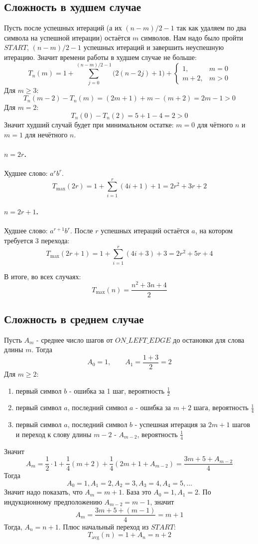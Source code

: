 \documentclass[12pt]{article}
\begin{document}
\subsection*{Сложность в худшем случае}

Пусть после успешных итераций (а их $(n-m)/2-1$ так как
удаляем по два символа на успешной итерации) 
остаётся $m$ символов.
Нам надо было пройти $START$, $(n-m)/2-1$ успешных итераций и завершить неуспешную итерацию.
Значит времени работы в худшем случае не больше:
\[
 T_n(m)=1+\sum_{j=0}^{(n-m)/2-1}\bigl(2(n-2j)+1\bigr)+\begin{cases}
 1,&m=0\\
 m+2,&m>0
 \end{cases}
\]
Для $m\geq3$:
\[
 T_n(m-2)-T_n(m)=(2m+1)+m-(m+2)=2m-1>0
\]
Для $m=2$:
\[
 T_n(0)-T_n(2)=5+1-4=2>0
\]
Значит худший случай будет при минимальном остатке:
$m=0$ для чётного $n$ и $m=1$ для нечётного $n$.

\paragraph{$n=2r$.}
Худшее слово: $a^r b^r$.
\[
 T_{\max}(2r)
 =1+\sum_{i=1}^{r}(4i+1)+1
 =2r^2+3r+2
\]

\paragraph{$n=2r+1$.}
Худшее слово: $a^{r+1}b^r$. После $r$ успешных итераций
остаётся $a$, на котором требуется $3$ перехода:
\[
 T_{\max}(2r+1)
 =1+\sum_{i=1}^{r}(4i+3)+3
 =2r^2+5r+4
\]

В итоге, во всех случаях:
\[
 T_{\max}(n)=\frac{n^2+3n+4}{2}
\]

\subsection*{Сложность в среднем случае}

Пусть $A_m$ - среднее число шагов от $ON\_LEFT\_EDGE$
до остановки для слова длины $m$. Тогда
\[
 A_0=1,\qquad A_1=\frac{1+3}{2}=2
\]
Для $m\geq2$:
\begin{enumerate}
  \item первый символ $b$ - ошибка за 1 шаг, вероятность $\frac12$
  \item первый символ $a$, последний символ $a$ - ошибка за $m+2$ шага, вероятность $\frac14$
  \item первый символ $a$, последний символ $b$ - успешная итерация за $2m+1$ шагов
   и переход к слову длины $m-2$ - $A_{m-2}$, вероятность $\frac14$
\end{enumerate}
Значит
\[
 A_m
 =\frac12\cdot1+\frac14(m+2)
   +\frac14(2m+1+A_{m-2})
 =\frac{3m+5+A_{m-2}}4
\]
Тогда
\[
A_0=1, A_1=2, A_2=3, A_3=4, A_4=5, \ldots
\]
Значит надо показать, что $A_m=m+1$. База это $A_0=1, A_1=2$.
По индукционному предположению $A_{m-2}=m-1$, значит
\[
 A_m=\frac{3m+5+(m-1)}4=m+1
\]
Тогда, $A_n=n+1$. Плюс начальный переход из $START$:
\[
 T_{\mathrm{avg}}(n)=1+A_n=n+2
\]
\end{document}
